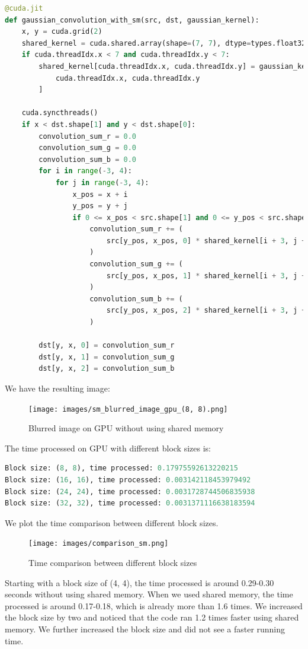 \documentclass[12pt]{article}
\begin{document}
\begin{lstlisting}[language=Python]
@cuda.jit
def gaussian_convolution_with_sm(src, dst, gaussian_kernel):
    x, y = cuda.grid(2)
    shared_kernel = cuda.shared.array(shape=(7, 7), dtype=types.float32)
    if cuda.threadIdx.x < 7 and cuda.threadIdx.y < 7:
        shared_kernel[cuda.threadIdx.x, cuda.threadIdx.y] = gaussian_kernel[
            cuda.threadIdx.x, cuda.threadIdx.y
        ]

    cuda.syncthreads()
    if x < dst.shape[1] and y < dst.shape[0]:
        convolution_sum_r = 0.0
        convolution_sum_g = 0.0
        convolution_sum_b = 0.0
        for i in range(-3, 4):
            for j in range(-3, 4):
                x_pos = x + i
                y_pos = y + j
                if 0 <= x_pos < src.shape[1] and 0 <= y_pos < src.shape[0]:
                    convolution_sum_r += (
                        src[y_pos, x_pos, 0] * shared_kernel[i + 3, j + 3]
                    )
                    convolution_sum_g += (
                        src[y_pos, x_pos, 1] * shared_kernel[i + 3, j + 3]
                    )
                    convolution_sum_b += (
                        src[y_pos, x_pos, 2] * shared_kernel[i + 3, j + 3]
                    )

        dst[y, x, 0] = convolution_sum_r
        dst[y, x, 1] = convolution_sum_g
        dst[y, x, 2] = convolution_sum_b
\end{lstlisting}

\noindent
We have the resulting image:
\begin{figure}[H]
\centering
    \texttt{[image: images/sm\_blurred\_image\_gpu\_(8, 8).png]}
    \caption{Blurred image on GPU without using shared memory}
\end{figure}

\noindent
The time processed on GPU with different block sizes is:

\begin{lstlisting}[language=Python]
Block size: (8, 8), time processed: 0.17975592613220215
Block size: (16, 16), time processed: 0.003142118453979492
Block size: (24, 24), time processed: 0.0031728744506835938
Block size: (32, 32), time processed: 0.0031371116638183594
\end{lstlisting}

\noindent
We plot the time comparison between different block sizes. 

\begin{figure}[H]
\centering
    \texttt{[image: images/comparison\_sm.png]}
    \caption{Time comparison between different block sizes}
\end{figure}


\noindent
Starting with a block size of (4, 4), the time processed is around 0.29-0.30 seconds without using shared memory. When we used shared memory, the time processed is around 0.17-0.18, which is already more than 1.6 times. We increased the block size by two and noticed that the code ran 1.2 times faster using shared memory. We further increased the block size and did not see a faster running time. 
\end{document}
